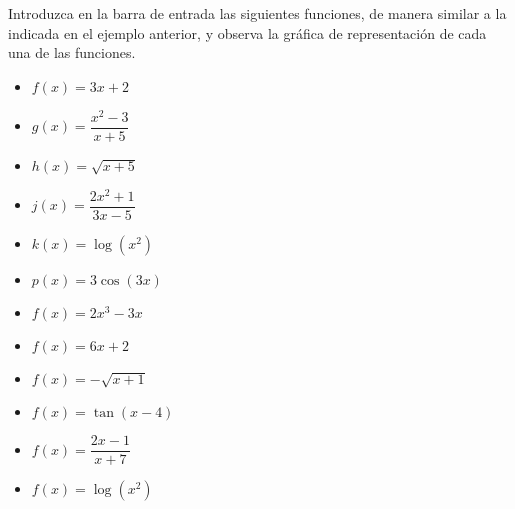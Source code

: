 \begin{ex}
	Introduzca en la barra de entrada las siguientes funciones, de manera similar a la indicada en el ejemplo anterior, y observa la gráfica de representación de cada una de las funciones.
	\begin{itemize}
		\item $f(x) = 3x+2$
		\item $g(x) = \dfrac{x^2-3}{x+5}$
		\item $h(x) = \sqrt{x+5}$
		\item $j(x) = \dfrac{2x^2+1}{3x-5}$
		\item $k(x) = \log (x^2)$
		\item $p(x) = 3\cos(3x)$
	\end{itemize}
	\begin{sol}
		\begin{itemize}
			\item $f(x) = 2x^3-3x$
			\item $f(x) = 6x+2$
			\item $f(x) = -\sqrt{x+1}$
			\item $f(x) = \tan (x-4)$
			\item $f(x) = \dfrac{2x-1}{x+7}$
			\item $f(x) = \log(x^2)$
		\end{itemize}
	\end{sol}
\end{ex}


